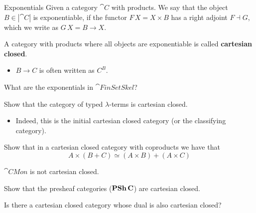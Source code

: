 \documentclass[handout]{beamer}
\begin{document}
\begin{frame}
   \begin{block}{Exponentials}
    Given a category $\cat{C}$ with products. We say that the object
    $B\in|\cat{C}|$ is exponentiable, if the functor $F\,X=X\times B$
    has a right adjoint $F\dashv G$, which we write as $G\,X = B \to
    X$.

    A category with products where all objects are exponentiable is called \textbf{cartesian
    closed}.
  \end{block}

  \begin{itemize}
  \item $B\to C$ is often written as $C^B$.
  \end{itemize}

  \begin{question}
    What are the exponentials in $\cat{FinSetSkel}$?
  \end{question}

\end{frame}

\begin{frame}
  \begin{exercise}
    Show that the category of typed $\lambda$-terms is cartesian closed.
  \end{exercise}

  \begin{itemize}
  \item Indeed, this is the initial cartesian closed category (or the
    classifying category).
  \end{itemize}

  \begin{exercise}
    Show that in a cartesian closed category with coproducts we have that
    \[ A \times (B + C) \simeq (A\times B) + (A \times C) \]
  \end{exercise}

  \begin{corollary}
    $\cat{CMon}$ is not cartesian closed.
  \end{corollary}
\end{frame}

\begin{frame}
  \begin{exercise}
    Show that the presheaf categories ($\mathbf{PSh}\,\mathbf{C}$) are cartesian
    closed.
  \end{exercise}

  \begin{exercise}
    Is there a cartesian closed category whose dual is also cartesian closed?
  \end{exercise}

\end{frame}
\end{document}
